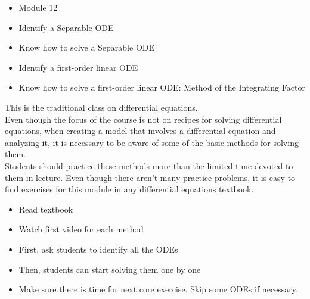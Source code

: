 \begin{lesson}

	\begin{itemize}
		\item Module 12
	\end{itemize}

	\begin{itemize}
		\item Identify a Separable ODE
		\item Know how to solve a Separable ODE
		\item Identify a first-order linear ODE
		\item Know how to solve a first-order linear ODE: Method of the Integrating Factor
	\end{itemize}
	

This is the traditional class on differential equations. \\

Even though the focus of the course is not on recipes for solving differential equations, when creating a model that involves a differential equation and analyzing it, it is necessary to be aware of some of the basic methods for solving them. \\

Students should practice these methods more than the limited time devoted to them in lecture. Even though there aren't many practice problems, it is easy to find exercises for this module in any differential equations textbook.

\begin{itemize}
	\item Read textbook
	\item Watch first video for each method
\end{itemize}


\end{lesson}






\begin{annotation}
\begin{goals}
	\begin{itemize}
		\item First, ask students to identify all the ODEs
		\item Then, students can start solving them one by one \\
	\end{itemize}
\end{goals}	
\begin{notes}
	\begin{itemize}
		\item Make sure there is time for next core exercise. Skip some ODEs if necessary.
	\end{itemize}	
\end{notes}
\end{annotation}

